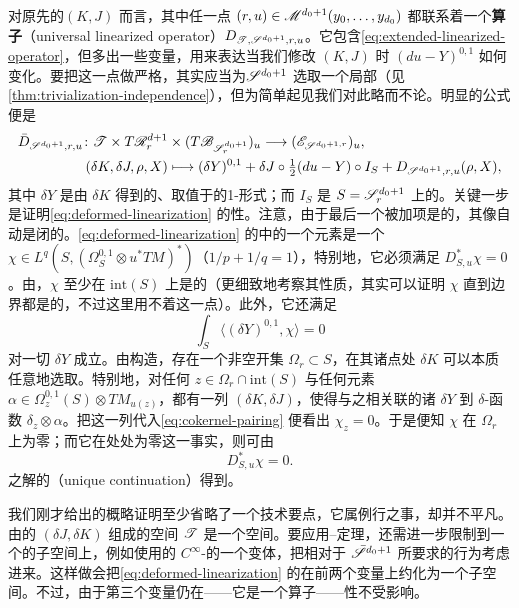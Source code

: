 对原先的\trPerturbationDatum{}$(K,J)$ 而言，其\trModuliSpace{}中任一点 $(r,u)\in\mathscr{M}^{d_0+1}(y_0,\ldots,y_{d_0})$ 都联系着一个\textbf{\trUniversal\trLinearization{}算子}（universal linearized operator）$D_{\mathscr{T},\mathscr{S}^{d_0+1},r,u}$。它包含\eqref{eq:extended-linearized-operator}，但多出一些变量，用来表达当我们修改 $(K,J)$ 时 $(du-Y)^{0,1}$ 如何变化。要把这一点做严格，其实应当为\trFamily{}$\mathscr{S}^{d_0+1}$ 选取一个局部\trTrivialization（见\cref{thm:trivialization-independence}），但为简单起见我们对此略而不论。明显的公式便是
\begin{equation}\label{eq:deformed-linearization}
\begin{aligned}
\bar{D}_{\mathscr{S}^{d_0+1},r,u}\colon\mathscr{T}\times T\mathscr{R}^{d+1}_r
&\times(T\mathscr{B}_{\mathscr{S}^{d_0+1}_r})_u\longrightarrow(\mathscr{E}_{\mathscr{S}^{d_0+1,r}})_u,\\
(\delta K,\delta J,\rho,X)&\longmapsto(\delta Y)^{0,1}+\delta J\circ\tfrac{1}{2}(du-Y)\circ I_S+D_{\mathscr{S}^{d_0+1},r,u}(\rho,X),
\end{aligned}
\end{equation}
其中 $\delta Y$ 是由 $\delta K$ 得到的、取值于\trHamiltonianVectorField{}的\trFibrewise{}1-形式；而 $I_S$ 是 $S=\mathscr{S}^{d_0+1}_r$ 上的\trComplexStructure。关键一步是证明\eqref{eq:deformed-linearization} 的\trSurjective{}性。注意，由于最后一个被加项是\trFredholm{}的，其像自动是闭的。\eqref{eq:deformed-linearization} 的\trCokernel{}中的一个元素是一个 $\chi\in L^q(S,(\Omega^{0,1}_S\otimes u^*TM)^*)$（$1/p+1/q=1$），特别地，它必须满足 $D^*_{S,u}\chi=0$。由\trEllipticRegularity，$\chi$ 至少在 $\mathrm{int}(S)$ 上是\trSmooth{}的（更细致地考察其性质，其实可以证明 $\chi$ 直到边界都是\trSmooth{}的，不过这里用不着这一点）。此外，它还满足
\begin{equation}\label{eq:cokernel-pairing}
\int_S\langle(\delta Y)^{0,1},\chi\rangle=0
\end{equation}
对一切 $\delta Y$ 成立。由构造，存在一个非空开集 $\Omega_r\subset S$，在其诸点处 $\delta K$ 可以本质任意地选取。特别地，对任何 $z\in\Omega_r\cap\mathrm{int}(S)$ 与任何元素 $\alpha\in\Omega^{0,1}_z(S)\otimes TM_{u(z)}$，都有一列 $(\delta K,\delta J)$，使得与之相关联的诸 $\delta Y$ \trWeakConvergence{}到 $\delta$-函数 $\delta_z\otimes\alpha$。把这一列代入\eqref{eq:cokernel-pairing} 便看出 $\chi_z=0$。于是便知 $\chi$ 在 $\Omega_r$ 上为零；而它在处处为零这一事实，则可由
\begin{equation*}
D^{*}_{S,u}\chi=0.
\end{equation*}
之解的\trUniqueContinuation（unique continuation）得到。
\begin{remark}\label{thm:sketch-proof-technical-point}
我们刚才给出的概略证明至少省略了一个技术要点，它属例行之事，却并不平凡。由\trAdmissible{}的 $(\delta J,\delta K)$ 组成的空间 $\mathscr{T}$ 是一个\trFrechet{}空间。要应用\trSard--\trSmale{}定理，还需进一步限制到一个\trDense{}的\trBanach{}子空间上，例如使用\trFloer{}的 $C^\infty$-\trTopology{}的一个变体，把相对于 $\bar{\mathscr{S}}^{d_0+1}$ 所要求的\trAsymptotic{}行为考虑进来。这样做会把\eqref{eq:deformed-linearization} 的\trDomain{}在前两个变量上约化为一个\trDense{}子空间。不过，由于第三个变量仍在——它是一个\trFredholm{}算子——\trSurjective{}性不受影响。
\end{remark}
